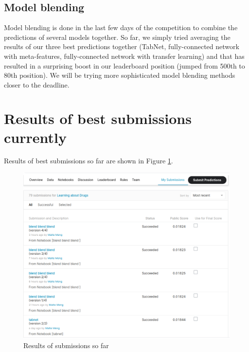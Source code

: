 \documentclass{article}
\begin{document}
\subsection{Model blending}
Model blending is done in the last few days of the competition to combine the predictions of several models together. So far, we simply tried averaging the results of our three best predictions together (TabNet, fully-connected network with meta-features, fully-connected network with transfer learning) and that has resulted in a surprising boost in our leaderboard position (jumped from 500th to 80th position). We will be trying more sophisticated model blending methods closer to the deadline.

\section{Results of best submissions currently}

Results of best submissions so far are shown in Figure \ref{fig:submissions}.
\begin{figure}[H]
\begin{center}
	\includegraphics[width=1\textwidth]{pics/submissions.png}
    \caption{Results of submissions so far}
\label{fig:submissions}
\end{center}
\end{figure}
\end{document}
